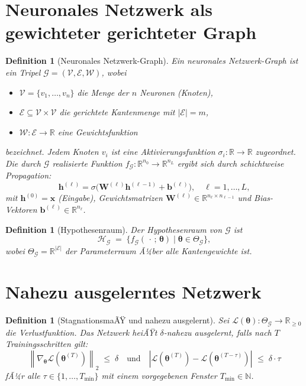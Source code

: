 ﻿\documentclass[12pt, a4paper, openany]{report}
\newtheorem{definition}[theorem]{Definition}
\newcommand{\R}{\mathbb{R}}
\newcommand{\N}{\mathbb{N}}
\newcommand{\calG}{\mathcal{G}}
\newcommand{\calH}{\mathcal{H}}
\newcommand{\calL}{\mathcal{L}}
\newcommand{\calV}{\mathcal{V}}
\newcommand{\calE}{\mathcal{E}}
\newcommand{\calW}{\mathcal{W}}
\newcommand{\norms}[1]{\left\|#1\right\|}
\newcommand{\abs}[1]{\left|#1\right|}
\begin{document}
\section{Neuronales Netzwerk als gewichteter gerichteter Graph}

\begin{definition}[Neuronales Netzwerk-Graph]
\label{def:nngraph}
Ein \emph{neuronales Netzwerk-Graph} ist ein Tripel
$\calG = (\calV, \calE, \calW)$, wobei
\begin{itemize}
  \item $\calV = \{v_1, \ldots, v_n\}$ die Menge der $n$ Neuronen (Knoten),
  \item $\calE \subseteq \calV \times \calV$ die gerichtete Kantenmenge mit
        $|\calE| = m$,
  \item $\calW : \calE \to \R$ eine Gewichtsfunktion
\end{itemize}
bezeichnet.  Jedem Knoten $v_i$ ist eine Aktivierungsfunktion
$\sigma_i : \R \to \R$ zugeordnet.  Die durch $\calG$ realisierte Funktion
$f_{\calG} : \R^{n_0} \to \R^{n_L}$ ergibt sich durch schichtweise Propagation:
\begin{equation}
  \label{eq:propagation}
  \bm{h}^{(\ell)} = \sigma\!\bigl(\bm{W}^{(\ell)} \bm{h}^{(\ell-1)} + \bm{b}^{(\ell)}\bigr),
  \quad \ell = 1, \ldots, L,
\end{equation}
mit $\bm{h}^{(0)} = \bm{x}$ (Eingabe), Gewichtsmatrizen
$\bm{W}^{(\ell)} \in \R^{n_\ell \times n_{\ell-1}}$ und Bias-Vektoren
$\bm{b}^{(\ell)} \in \R^{n_\ell}$.
\end{definition}

\begin{definition}[Hypothesenraum]
\label{def:hyp}
Der \emph{Hypothesenraum} von $\calG$ ist
\[
  \calH_{\calG} \;=\;
  \bigl\{f_{\calG}(\,\cdot\,;\,\bm{\theta}) \;\big|\; \bm{\theta} \in \Theta_{\calG}\bigr\},
\]
wobei $\Theta_{\calG} = \R^{|\calE|}$ der Parameterraum Ã¼ber alle Kantengewichte ist.
\end{definition}

\section{Nahezu ausgelerntes Netzwerk}

\begin{definition}[StagnationsmaÃŸ und nahezu ausgelernt]
\label{def:nearconv}
Sei $\calL(\bm{\theta}) : \Theta_{\calG} \to \R_{\geq 0}$ die Verlustfunktion.
Das Netzwerk heiÃŸt \emph{$\delta$-nahezu ausgelernt}, falls nach $T$ Trainingsschritten
gilt:
\begin{equation}
  \label{eq:stagnation}
  \norms{\nabla_{\bm{\theta}} \calL(\bm{\theta}^{(T)})}_2 \;\leq\; \delta
  \quad \text{und} \quad
  \abs{\calL(\bm{\theta}^{(T)}) - \calL(\bm{\theta}^{(T-\tau)})}_{}
  \;\leq\; \delta \cdot \tau
\end{equation}
fÃ¼r alle $\tau \in \{1, \ldots, T_{\min}\}$ mit einem vorgegebenen Fenster $T_{\min} \in \N$.
\end{definition}
\end{document}
